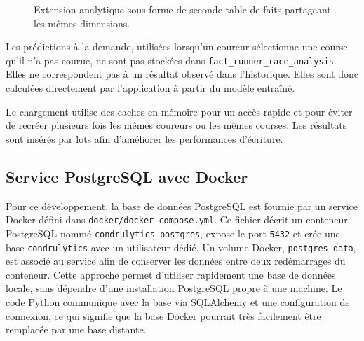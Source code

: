 \documentclass[12pt,a4paper]{article}
\begin{document}
\begin{figure}[h!]
{%
    }
    \caption{Extension analytique sous forme de seconde table de faits partageant les mêmes dimensions.}
    \label{fig:schema-etendu}
\end{figure}

Les prédictions à la demande, utilisées lorsqu'un coureur sélectionne une course qu'il n'a pas courue, ne sont pas stockées dans \texttt{fact\_runner\_race\_analysis}. Elles ne correspondent pas à un résultat observé dans l'historique. Elles sont donc calculées directement par l'application à partir du modèle entraîné.

Le chargement utilise des caches en mémoire pour un accès rapide et pour éviter de recréer plusieurs fois les mêmes coureurs ou les mêmes courses. Les résultats sont insérés par lots afin d'améliorer les performances d'écriture.

\subsection{Service PostgreSQL avec Docker}

Pour ce développement, la base de données PostgreSQL est fournie par un service Docker défini dans \texttt{docker/docker-compose.yml}. Ce fichier décrit un conteneur PostgreSQL nommé \texttt{condrulytics\_postgres}, expose le port \texttt{5432} et crée une base \texttt{condrulytics} avec un utilisateur dédié. Un volume Docker, \texttt{postgres\_data}, est associé au service afin de conserver les données entre deux redémarrages du conteneur. Cette approche permet d'utiliser rapidement une base de données locale, sans dépendre d'une installation PostgreSQL propre à une machine. Le code Python communique avec la base via SQLAlchemy et une configuration de connexion, ce qui signifie que la base Docker pourrait très facilement être remplacée par une base distante. 
\end{document}

